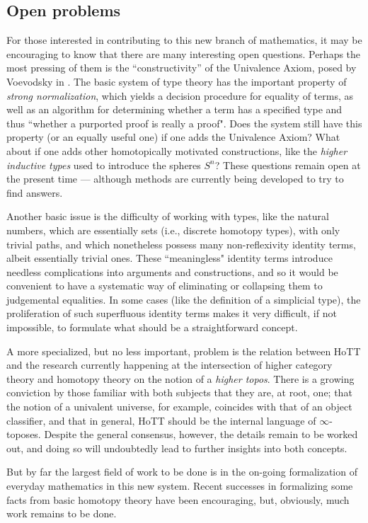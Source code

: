{\subsection*{Open problems} 

For those interested in contributing to this new branch of mathematics, it may be encouraging to know that there are many interesting open questions.  Perhaps the most pressing of them is the ``constructivity'' of the Univalence Axiom, posed by Voevodsky in \cite{Vo2012}.  The basic system of type theory has the important property of \emph{strong normalization}, which yields a decision procedure for equality of terms, as well as an algorithm for determining whether a term has a specified type and thus ``whether a purported proof is really a proof".  Does the system still have this property (or an equally useful one) if one adds the Univalence Axiom?  What about if one adds other homotopically motivated constructions, like the \emph{higher inductive types} used to introduce the spheres $S^n$?  These questions remain open at the present time --- although methods are currently being developed to try to find answers.

Another basic issue is the difficulty of working with types, like the natural numbers, which are essentially sets (i.e., discrete homotopy types), with only trivial paths, and which nonetheless possess many non-reflexivity identity terms, albeit essentially trivial ones.  These ``meaningless" identity terms introduce needless complications into arguments and constructions, and so it would be convenient to have a systematic way of eliminating or collapsing them to judgemental equalities.  In some cases (like the definition of a simplicial type), the proliferation of such superfluous identity terms makes it very difficult, if not impossible, to formulate what should be a straightforward concept.

A more specialized, but no less important, problem is the relation between HoTT and the research currently happening at the intersection of higher category theory and homotopy theory on the notion of a \emph{higher topos}.  There is a growing conviction by those familiar with both subjects that they are, at root, one; that the notion of a univalent universe, for example, coincides with that of an object classifier, and that in general, HoTT should be the internal language of $\infty$-toposes.  Despite the general consensus, however, the details remain to be worked out, and doing so will undoubtedly lead to further insights into both concepts.

But by far the largest field of work to be done is in the on-going formalization of everyday mathematics in this new system.  Recent successes in formalizing some facts from basic homotopy theory have been encouraging, but, obviously, much work remains to be done.

%

}%

